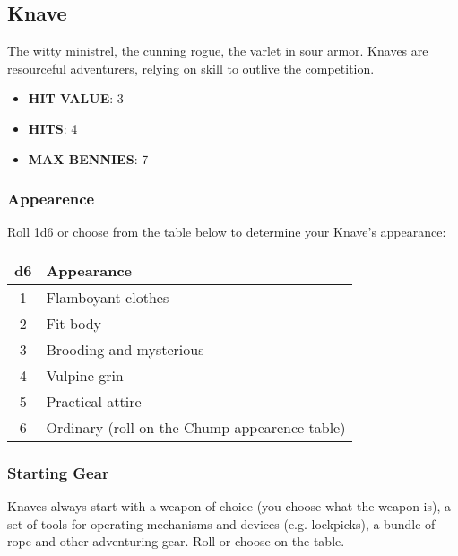 \newpage
\subsection{Knave}
The witty ministrel, the cunning rogue, the varlet in sour armor. Knaves are resourceful adventurers, relying on skill to outlive the competition.

\begin{multicols}{2}
\begin{itemize}
  \item \textbf{HIT VALUE}: 3
  \item \textbf{HITS}: 4
  \item \textbf{MAX BENNIES}: 7
\end{itemize}

\subsubsection*{Appearence}
Roll 1d6 or choose from the table below to determine your Knave's appearance:

\begin{adjustbox}{width=0.85\columnwidth,center}
\begin{tabular}{|c|l|}
\hline
\textbf{d6} & \textbf{Appearance} \\
\hline
1 & Flamboyant clothes \\
2 & Fit body \\
3 & Brooding and mysterious \\
4 & Vulpine grin \\
5 & Practical attire \\
6 & Ordinary (roll on the Chump appearence table)\\
\hline
\end{tabular}
\end{adjustbox}

\subsubsection*{Starting Gear}
Knaves always start with a weapon of choice (you choose what the weapon is), a set of tools for operating mechanisms and devices (e.g. lockpicks), a bundle of rope and other adventuring gear. Roll or choose on the table.


\end{multicols}
